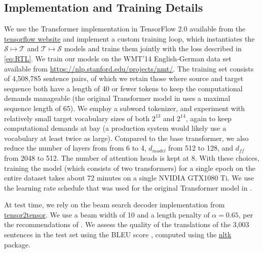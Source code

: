 \documentclass[11pt,a4paper]{article}
\begin{document}
\subsection{Implementation and Training Details}
We use the Transformer implementation in TensorFlow 2.0 available from the \href{https://www.tensorflow.org/tutorials/text/transformer}{tensorflow website} and implement a custom training loop, which instantiates the $\mathcal{S}\mapsto\mathcal{T}$ and $\mathcal{T}\mapsto\mathcal{S}$ models and trains them jointly with the loss described in \eqref{eq:RTL}. We train our models on the WMT'14 English-German data set available from \href{https://nlp.stanford.edu/projects/nmt/}{https://nlp.stanford.edu/projects/nmt/}. The training set consists of 4,508,785 sentence pairs, of which we retain those where source and target sequence both have a length of 40 or fewer tokens to keep the computational demands manageable (the original Transformer model in \citet{transformer} uses a maximal sequence length of 65). We employ a subword tokenizer, and experiment with relatively small target vocabulary sizes of both $2^{13}$ and $2^{14}$, again to keep computational demands at bay (a production system would likely use a vocabulary at least twice as large). Compared to the base transformer, we also reduce the number of layers from from 6 to 4, $d_{model}$ from 512 to 128, and $d_{ff}$ from 2048 to 512. The number of attention heads is kept at 8.
With these choices, training the model (which consists of two transformers) for a single epoch on the entire dataset takes about 72 minutes on a single NVIDIA GTX1080 Ti. We use the learning rate schedule that was used for the original Transformer model in \cite{transformer}.


At test time, we rely on the beam search decoder implementation from \href{https://github.com/tensorflow/tensor2tensor/blob/master/tensor2tensor/utils}{tensor2tensor}. We use a beam width of 10 and a length penalty of $\alpha=0.65$, per the recommendations of \citet{googlenmt}. We assess the quality of the translations of the 3,003 sentences in the test set using the BLEU score \citep{bleu}, computed using the \href{https://www.nltk.org/}{nltk} package.
\end{document}
